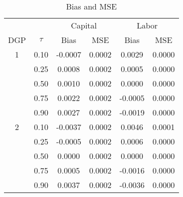 \begin{table}[ht]
\centering
\caption{Bias and MSE} 
\begin{tabular}{cccccc}
  \hline\hline & & \multicolumn{2}{c}{Capital} & \multicolumn{2}{c}{Labor} \\ \cmidrule(lr){3-4} \cmidrule(lr){5-6}DGP & $\tau$ & Bias & MSE & Bias & MSE \\ 
  \hline
1 & 0.10 & -0.0007 & 0.0002 & 0.0029 & 0.0000 \\ 
   & 0.25 & 0.0008 & 0.0002 & 0.0005 & 0.0000 \\ 
   & 0.50 & 0.0010 & 0.0002 & 0.0000 & 0.0000 \\ 
   & 0.75 & 0.0022 & 0.0002 & -0.0005 & 0.0000 \\ 
   & 0.90 & 0.0027 & 0.0002 & -0.0019 & 0.0000 \\ 
  2 & 0.10 & -0.0037 & 0.0002 & 0.0046 & 0.0001 \\ 
   & 0.25 & -0.0005 & 0.0002 & 0.0006 & 0.0000 \\ 
   & 0.50 & 0.0000 & 0.0002 & 0.0000 & 0.0000 \\ 
   & 0.75 & 0.0005 & 0.0002 & -0.0016 & 0.0000 \\ 
   & 0.90 & 0.0037 & 0.0002 & -0.0036 & 0.0000 \\ 
   \hline
\end{tabular}
\end{table}
